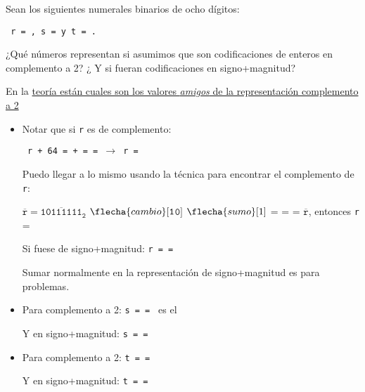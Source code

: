 \begin{enunciado}{\ejercicio}
  Sean los siguientes numerales binarios de ocho dígitos:\par
  \begin{center}
    {\tt
      r = ,
      s =  y
      t = .
    }
  \end{center}
  \par
  ¿Qué números representan si asumimos que son codificaciones de
  enteros en complemento a 2? ¿ Y si fueran codificaciones en signo+magnitud?
\end{enunciado}

En la
\hyperlink{teoria-1:complementoA2}{teoría están cuales son los valores \textit{amigos} de la representación complemento a 2}
\begin{itemize}[label=\tiny{}]
  \item
        Notar que si \texttt{r} es de complemento:\par
        {\tt
          r + 64 =  +  =
           = 
          $\to$
                r = 
        }\par
        Puedo llegar a lo mismo usando la técnica para encontrar el complemento de \texttt{r}:\par
        $\overline{\mathtt{r}} = \overline{\mathtt{1011 1111}}_{\mathtt{2}}$
        $\flecha{cambio}[\texttt{1}$\leftrightarrow$\texttt{0}]$
        $\flecha{sumo}[1]$
         =
                 =  = $\overline{\mathtt{r}}$, entonces \texttt{r} = 

        Si fuese de signo+magnitud:
        {\tt r =  =  }\par
        Sumar normalmente en la representación de signo+magnitud es para problemas.

  \item
        Para complemento a 2: {\tt s =  =  }
        es el \par
        Y en signo+magnitud: {\tt s =  =  }

  \item
        Para complemento a 2: {\tt t =  =  } \par
        Y en signo+magnitud: {\tt t =  =  }

\end{itemize}

